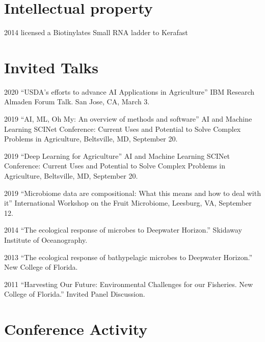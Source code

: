\documentclass[12pt,letterpaper]{report}
\begin{document}
   \section*{Intellectual property}
          \begin{tablist}
          \item[2014] licensed a Biotinylates Small RNA ladder to Kerafast
          \end{tablist} 
    \section*{Invited Talks}

    \begin{tablist}
    
    	\item[2020] \tab \enquote{USDA's efforts to advance AI Applications in Agriculture} IBM Research Almaden Forum Talk. San Jose, CA,  March 3.

        \item[2019] \tab \enquote{AI, ML, Oh My: An overview of methods and software}  AI and Machine Learning SCINet Conference:  Current Uses and Potential to Solve Complex Problems in Agriculture, Beltsville, MD, September 20.
        
        \item[2019] \tab \enquote{Deep Learning for Agriculture} AI and Machine Learning SCINet Conference:  Current Uses and Potential to Solve Complex Problems in Agriculture,  Beltsville, MD, September 20.
        
        \item[2019] \tab \enquote{Microbiome data are compositional: What this means and how to deal with it} International Workshop on the Fruit Microbiome,  Leesburg, VA, September 12.
        \item[2014] \tab \enquote{The ecological response of microbes to Deepwater Horizon.} Skidaway Institute of Oceanography. 
        \item[2013] \tab \enquote{The ecological response of bathypelagic microbes to Deepwater Horizon.} New College of Florida.
        \item[2011] \tab \enquote{Harvesting Our Future: Environmental Challenges for our Fisheries. New College of Florida.} Invited Panel Discussion.


        
       \end{tablist}

  
    \section*{Conference Activity}
\end{document}
